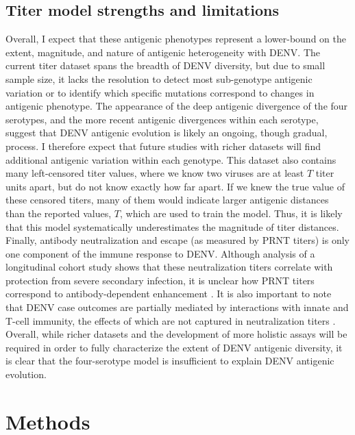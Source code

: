 \subsection{Titer model strengths and limitations}
Overall, I expect that these antigenic phenotypes represent a lower-bound on the extent, magnitude, and nature of antigenic heterogeneity with DENV.
The current titer dataset spans the breadth of DENV diversity, but due to small sample size, it lacks the resolution to detect most sub-genotype antigenic variation or to identify which specific mutations correspond to changes in antigenic phenotype.
The appearance of the deep antigenic divergence of the four serotypes, and the more recent antigenic divergences within each serotype, suggest that DENV antigenic evolution is likely an ongoing, though gradual, process.
I therefore expect that future studies with richer datasets will find additional antigenic variation within each genotype.
This dataset also contains many left-censored titer values, where we know two viruses are at least $T$ titer units apart, but do not know exactly how far apart.
If we knew the true value of these censored titers, many of them would indicate larger antigenic distances than the reported values, $T$, which are used to train the model.
Thus, it is likely that this model systematically underestimates the magnitude of titer distances.
Finally, antibody neutralization and escape (as measured by PRNT titers) is only one component of the immune response to DENV.
Although analysis of a longitudinal cohort study shows that these neutralization titers correlate with protection from severe secondary infection, it is unclear how PRNT titers correspond to antibody-dependent enhancement \citep{katzelnick2016neutralizing}.
It is also important to note that DENV case outcomes are partially mediated by interactions with innate and T-cell immunity, the effects of which are not captured in neutralization titers \citep{green2014innate}.
Overall, while richer datasets and the development of more holistic assays will be required in order to fully characterize the extent of DENV antigenic diversity, it is clear that the four-serotype model is insufficient to explain DENV antigenic evolution.
\clearpage
\section{Methods}
